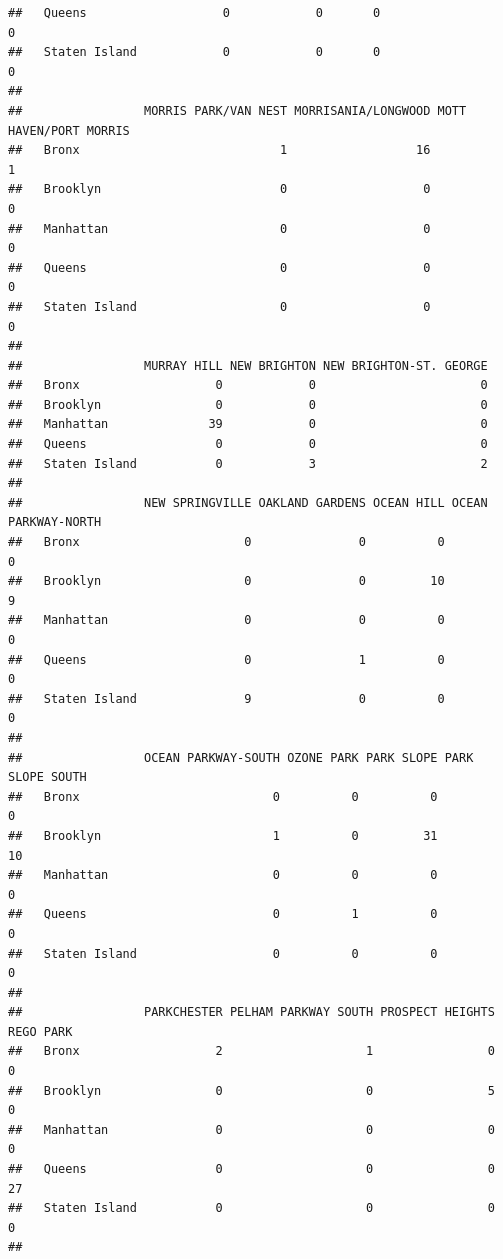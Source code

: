 \documentclass[
]{article}
\begin{document}
\begin{verbatim}
##   Queens                   0            0       0                   0
##   Staten Island            0            0       0                   0
##                
##                 MORRIS PARK/VAN NEST MORRISANIA/LONGWOOD MOTT HAVEN/PORT MORRIS
##   Bronx                            1                  16                      1
##   Brooklyn                         0                   0                      0
##   Manhattan                        0                   0                      0
##   Queens                           0                   0                      0
##   Staten Island                    0                   0                      0
##                
##                 MURRAY HILL NEW BRIGHTON NEW BRIGHTON-ST. GEORGE
##   Bronx                   0            0                       0
##   Brooklyn                0            0                       0
##   Manhattan              39            0                       0
##   Queens                  0            0                       0
##   Staten Island           0            3                       2
##                
##                 NEW SPRINGVILLE OAKLAND GARDENS OCEAN HILL OCEAN PARKWAY-NORTH
##   Bronx                       0               0          0                   0
##   Brooklyn                    0               0         10                   9
##   Manhattan                   0               0          0                   0
##   Queens                      0               1          0                   0
##   Staten Island               9               0          0                   0
##                
##                 OCEAN PARKWAY-SOUTH OZONE PARK PARK SLOPE PARK SLOPE SOUTH
##   Bronx                           0          0          0                0
##   Brooklyn                        1          0         31               10
##   Manhattan                       0          0          0                0
##   Queens                          0          1          0                0
##   Staten Island                   0          0          0                0
##                
##                 PARKCHESTER PELHAM PARKWAY SOUTH PROSPECT HEIGHTS REGO PARK
##   Bronx                   2                    1                0         0
##   Brooklyn                0                    0                5         0
##   Manhattan               0                    0                0         0
##   Queens                  0                    0                0        27
##   Staten Island           0                    0                0         0
##                

\end{verbatim}
\end{document}
